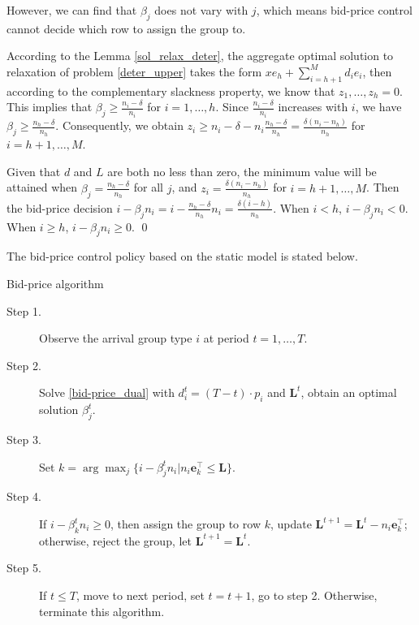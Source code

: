 However, we can find that $\beta_{j}$ does not vary with $j$, which means bid-price control cannot decide which row to assign the group to.

\begin{pf}
According to the Lemma \ref{sol_relax_deter}, the aggregate optimal solution to relaxation of problem \eqref{deter_upper} takes the form $x e_{h} + \sum_{i=h+1} ^{M} d_{i} e_{i}$, then according to the complementary slackness property, we know that $z_1, \ldots, z_h = 0$. This implies that $\beta_j \geq \frac{n_i - \delta}{n_i}$ for $i = 1,\ldots, h$. Since $\frac{n_i - \delta}{n_i}$ increases with $i$, we have $\beta_j \geq \frac{n_h - \delta}{n_h}$. Consequently, we obtain $z_{i} \geq n_i - \delta - n_i \frac{n_h - \delta}{n_h} = \frac{\delta(n_i-n_h)}{n_h}$ for $i = h+1, \ldots, M$.

Given that $d$ and $L$ are both no less than zero, the minimum value will be attained when $\beta_j = \frac{n_h - \delta}{n_h}$ for all $j$, and $z_i = \frac{\delta(n_i-n_h)}{n_h}$ for $i = h+1, \ldots, M$. Then the bid-price decision $i -\beta_{j} n_i = i - \frac{n_h -\delta}{n_h} n_i = \frac{\delta (i-h)}{n_h}$. When $i < h$, $i -\beta_{j} n_i <0$. When $i \geq h$, $i -\beta_{j} n_i \geq 0$. \qed
\end{pf}

The bid-price control policy based on the static model is stated below.
\begin{algorithm}[H]
  \caption{Bid-price algorithm}
  \begin{description}
    \item[Step 1.] Observe the arrival group type $i$ at period $t = 1, \ldots, T$.
    \item[Step 2.] Solve \eqref{bid-price_dual} with $d_i^{t} = (T-t) \cdot p_i$ and $\mathbf{L}^{t}$, obtain an optimal solution $\beta_{j}^{t}$.
    \item[Step 3.] Set $k = \arg \max_{j} \{i -\beta_{j}^{t} n_i | n_i \mathbf{e}_{k}^{\top} \leq \mathbf{L}\}$.
    \item[Step 4.] If $i -\beta_{k}^{t} n_i \geq 0$, then assign the group to row $k$, update $\mathbf{L}^{t+1} = \mathbf{L}^{t} - n_i \mathbf{e}_{k}^{\top}$; otherwise, reject the group, let $\mathbf{L}^{t+1} = \mathbf{L}^{t}$. 
    \item[Step 5.] If $t \leq T$, move to next period, set $t = t+1$, go to step 2. Otherwise, terminate this algorithm.
  \end{description}
\end{algorithm}


